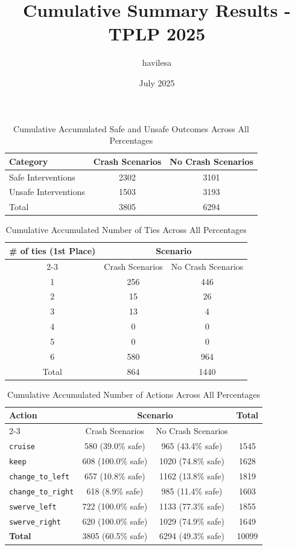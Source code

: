 \documentclass{article}
\title{Cumulative Summary Results - TPLP 2025}
\author{havilesa}
\date{July 2025}
\begin{document}
\maketitle

\begin{table}[h]
\centering
\caption{Cumulative Accumulated Safe and Unsafe Outcomes Across All Percentages}
\begin{tabular}{l|cc}
\toprule
Category & Crash Scenarios & No Crash Scenarios \\
\midrule
Safe Interventions & 2302 & 3101 \\ 
Unsafe Interventions & 1503 & 3193 \\ 
\midrule
Total & 3805 & 6294 \\ 
\bottomrule
\end{tabular}
\end{table}

\begin{table}[h]
\centering
\caption{Cumulative Accumulated Number of Ties Across All Percentages}
\begin{tabular}{c|cc}
\toprule
\multirow{2}{*}{\# of ties (1st Place)} & \multicolumn{2}{c|}{Scenario} \\
\cmidrule{2-3}
 & Crash Scenarios & No Crash Scenarios \\
\midrule
1 & 256 & 446 \\ 
2 & 15 & 26 \\ 
3 & 13 & 4 \\ 
4 & 0 & 0 \\ 
5 & 0 & 0 \\ 
6 & 580 & 964 \\ 
\midrule
Total & 864 & 1440 \\ 
\bottomrule
\end{tabular}
\end{table}

\begin{table}[h]
\centering
\caption{Cumulative Accumulated Number of Actions Across All Percentages}
\begin{tabular}{l|cc|c}
\toprule
\multirow{2}{*}{Action} & \multicolumn{2}{c|}{Scenario} & \multirow{2}{*}{Total} \\
\cmidrule{2-3}
 & Crash Scenarios & No Crash Scenarios \\
\midrule
\texttt{cruise} & 580 (39.0\% safe) & 965 (43.4\% safe) & 1545 \\ 
\texttt{keep} & 608 (100.0\% safe) & 1020 (74.8\% safe) & 1628 \\ 
\texttt{change\_to\_left} & 657 (10.8\% safe) & 1162 (13.8\% safe) & 1819 \\ 
\texttt{change\_to\_right} & 618 (8.9\% safe) & 985 (11.4\% safe) & 1603 \\ 
\texttt{swerve\_left} & 722 (100.0\% safe) & 1133 (77.3\% safe) & 1855 \\ 
\texttt{swerve\_right} & 620 (100.0\% safe) & 1029 (74.9\% safe) & 1649 \\ 
\midrule
\textbf{Total} & 3805 (60.5\% safe) & 6294 (49.3\% safe) & 10099 \\ 
\bottomrule
\end{tabular}
\end{table}
\end{document}
